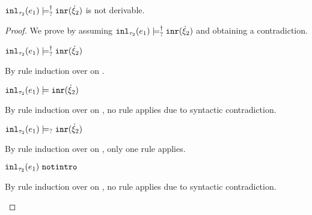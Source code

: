 \begin{lemma}
  \label{lem:inl-notsatormay-inr}
  $\mathtt{inl}_{\tau_2}({e_1}) \models_{?}^{\dag} \mathtt{inr}(\dot{\xi}_2)$ is not derivable.
\end{lemma}
\begin{proof}
  We prove by assuming $\mathtt{inl}_{\tau_2}({e_1}) \models_{?}^{\dag} \mathtt{inr}(\dot{\xi}_2)$ and obtaining a contradiction.
  \begin{pfsteps*}
  \item $\mathtt{inl}_{\tau_2}({e_1}) \models_{?}^{\dag} \mathtt{inr}(\dot{\xi}_2)$  
  \end{pfsteps*}
  By rule induction over  on .
  \begin{byCases}
    \item[\text{(\ref{rule:CSMSSat})}]
    \begin{pfsteps*}
    \item $\mathtt{inl}_{\tau_2}({e_1}) \models \mathtt{inr}(\dot{\xi}_2)$  
    \end{pfsteps*} 
    By rule induction over  on , no rule applies due to syntactic contradiction.
    \item[\text{(\ref{rule:CSMSMay})}] 
    \begin{pfsteps*}
    \item $\mathtt{inl}_{\tau_2}({e_1}) \models_{?} \mathtt{inr}(\dot{\xi}_2)$  
    \end{pfsteps*} 
    By rule induction over  on , only one rule applies.
    \begin{byCases}
      \item[\text{(\ref{rule:CMSNotIntro})}]
      \begin{pfsteps*}
      \item $\mathtt{inl}_{\tau_2}({e_1}) ~\mathtt{notintro}$  
      \end{pfsteps*} 
      By rule induction over  on , no rule applies due to syntactic contradiction.
    \end{byCases}
  \end{byCases}
  \resetpfcounter
\end{proof}

